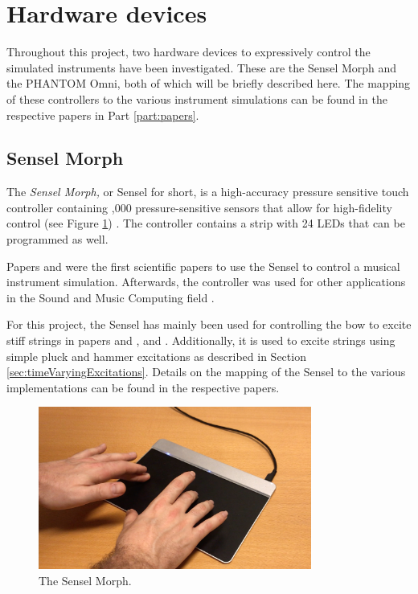 

\section{Hardware devices}
Throughout this project, two hardware devices to expressively control the simulated instruments have been investigated. These are the Sensel Morph and the PHANTOM Omni, both of which will be briefly described here. The mapping of these controllers to the various instrument simulations can be found in the respective papers in Part \ref{part:papers}. 

\subsection{Sensel Morph}\label{sec:sensel}
The \textit{Sensel Morph,} or Sensel for short, is a high-accuracy pressure sensitive touch controller containing ,000 pressure-sensitive sensors that allow for high-fidelity control (see Figure \ref{fig:sensel}) \cite{sensel}. The controller contains a strip with 24 LEDs that can be programmed as well.

Papers \citeP[A] and \citeP[B] were the first scientific papers to use the Sensel to control a musical instrument simulation. Afterwards, the controller was used for other applications in the Sound and Music Computing field \cite{Paisa2019,Pardue2020,vanWalstijn2021}. 

For this project, the Sensel has mainly been used for controlling the bow to excite stiff strings in papers \citeP[A] and \citeP[B], \citeP[C] and \citeP[D]. Additionally, it is used to excite strings using simple pluck and hammer excitations as described in Section \ref{sec:timeVaryingExcitations}. Details on the mapping of the Sensel to the various implementations can be found in the respective papers.

\begin{figure}[t]
    \centering
    \includegraphics[width=0.8\textwidth]{figures/contributions/realtime/senselHands.jpg}
    \caption{The Sensel Morph. \label{fig:sensel}}
\end{figure}


